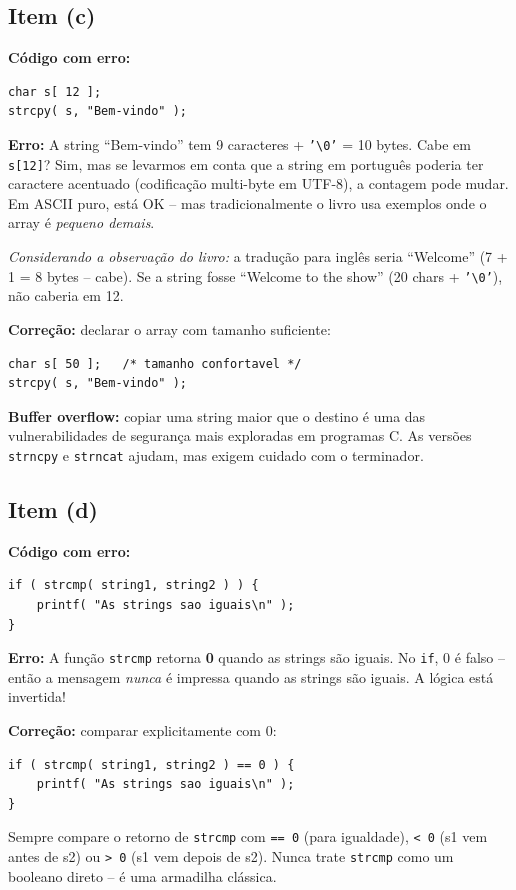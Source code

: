 \documentclass[12pt,a4paper]{article}
\begin{document}
\subsection*{Item (c)}
\begin{respostabox}
\textbf{Código com erro:}
\begin{lstlisting}
char s[ 12 ];
strcpy( s, "Bem-vindo" );
\end{lstlisting}

\textbf{Erro:} A string ``Bem-vindo'' tem 9 caracteres + \texttt{'\textbackslash 0'}
= 10 bytes. Cabe em \texttt{s[12]}? Sim, mas se levarmos em conta que a string em
português poderia ter caractere acentuado (codificação multi-byte em UTF-8), a
contagem pode mudar. Em ASCII puro, está OK -- mas tradicionalmente o livro usa
exemplos onde o array é \textit{pequeno demais}.

\textit{Considerando a observação do livro:} a tradução para inglês seria ``Welcome''
(7 + 1 = 8 bytes -- cabe). Se a string fosse ``Welcome to the show'' (20 chars +
\texttt{'\textbackslash 0'}), não caberia em 12.

\textbf{Correção:} declarar o array com tamanho suficiente:
\begin{lstlisting}
char s[ 50 ];   /* tamanho confortavel */
strcpy( s, "Bem-vindo" );
\end{lstlisting}

\begin{erroco}
  \textbf{Buffer overflow:} copiar uma string maior que o destino é uma das
  vulnerabilidades de segurança mais exploradas em programas C. As versões
  \texttt{strncpy} e \texttt{strncat} ajudam, mas exigem cuidado com o
  terminador.
\end{erroco}
\end{respostabox}

\subsection*{Item (d)}
\begin{respostabox}
\textbf{Código com erro:}
\begin{lstlisting}
if ( strcmp( string1, string2 ) ) {
    printf( "As strings sao iguais\n" );
}
\end{lstlisting}

\textbf{Erro:} A função \texttt{strcmp} retorna \textbf{0} quando as strings são
iguais. No \texttt{if}, 0 é falso -- então a mensagem \textit{nunca} é impressa
quando as strings são iguais. A lógica está invertida!

\textbf{Correção:} comparar explicitamente com 0:
\begin{lstlisting}
if ( strcmp( string1, string2 ) == 0 ) {
    printf( "As strings sao iguais\n" );
}
\end{lstlisting}

\begin{boaprática}
  Sempre compare o retorno de \texttt{strcmp} com \texttt{== 0} (para igualdade),
  \texttt{< 0} (s1 vem antes de s2) ou \texttt{> 0} (s1 vem depois de s2). Nunca
  trate \texttt{strcmp} como um booleano direto -- é uma armadilha clássica.
\end{boaprática}
\end{respostabox}
\end{document}
